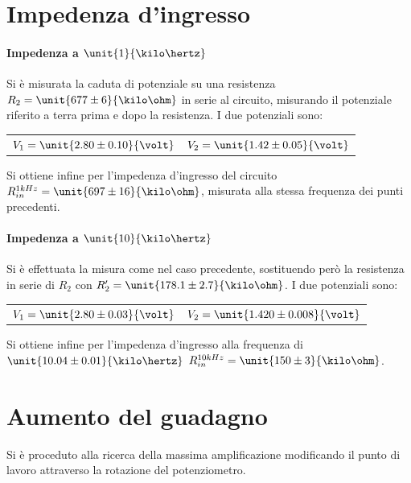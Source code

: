 \documentclass[10pt,a4paper]{article}
\begin{document}
\section{Impedenza d'ingresso}

\paragraph{Impedenza a $\unit{1}{\kilo\hertz}$} Si è misurata la caduta di potenziale su una resistenza $R_2 = \unit{677 \pm 6}{\kilo\ohm}$ in serie al circuito, misurando il potenziale riferito a terra prima e dopo la resistenza.
I due potenziali sono:
\begin{table}[h!]
	\centering
	\begin{tabular}{cc}
		$V_1 = \unit{2.80 \pm 0.10}{\volt}$  & $V_2 = \unit{1.42 \pm 0.05}{\volt}$
	\end{tabular}
\end{table}

Si ottiene infine per l'impedenza d'ingresso del circuito $R_{in}^{1kHz} = \unit{697 \pm 16}{\kilo\ohm}$, misurata alla stessa frequenza dei punti precedenti.

\paragraph{Impedenza a $\unit{10}{\kilo\hertz}$}  Si è effettuata la misura come nel caso precedente, sostituendo però la resistenza in serie di $R_2$ con $R_2' = \unit{178.1 \pm 2.7}{\kilo\ohm}$.
I due potenziali sono:
\begin{table}[h!]
	\centering
	\begin{tabular}{cc}
		$V_1 = \unit{2.80 \pm 0.03}{\volt}$  & $V_2 = \unit{1.420 \pm 0.008}{\volt}$
	\end{tabular}
\end{table}

Si ottiene infine per l'impedenza d'ingresso alla frequenza di $\unit{10.04 \pm 0.01}{\kilo\hertz}$ $R_{in}^{10kHz} = \unit{150 \pm 3}{\kilo\ohm}$.

\section{Aumento del guadagno}

Si è proceduto alla ricerca della massima amplificazione modificando il punto di lavoro attraverso la rotazione del potenziometro.
\end{document}
